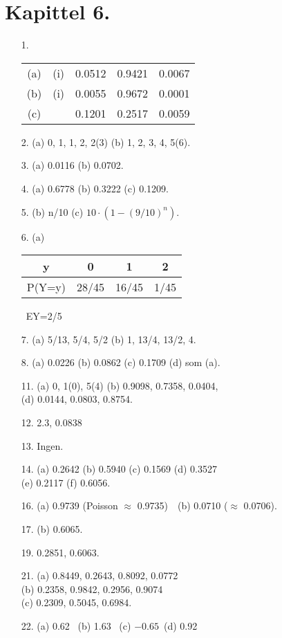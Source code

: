 \section*{Kapittel 6.}
\begin{itemize}         
\item[1.]   \begin{tabular}[t]{cclll}
              (a) & (i) & 0.0512 & 0.9421 & 0.0067\\
              (b) & (i) & 0.0055 & 0.9672 & 0.0001\\
              (c) &     & 0.1201 & 0.2517 & 0.0059
         \end{tabular}
\item[2.]  (a)  0, 1, 1, 2, 2(3)    (b)  1, 2, 3, 4, 5(6).
\item[3.]  (a)  0.0116    (b)  0.0702.
\item[4.]  (a)  0.6778    (b)  0.3222    (c)  0.1209.
\item[5.]  (b)  n/10     (c)  $10\cdot (1-(9/10)^n )$.
\item[6.]  (a)  \begin{tabular}{c|ccc}
            y &  0 & 1 & 2   \\ \hline
       P(Y=y) & 28/45 & 16/45 & 1/45                            
                \end{tabular} \  EY=2/5
\item[7.]  (a)  5/13, 5/4, 5/2    (b)  1, 13/4, 13/2, 4.
\item[8.]  (a)  0.0226   (b)  0.0862   (c)  0.1709   (d)  som (a).
\item[11.]  (a)  0, 1(0), 5(4)   (b)  0.9098, 0.7358, 0.0404,\\
              (d)  0.0144, 0.0803,  0.8754.
\item[12.] 2.3, 0.0838
\item[13.] Ingen.
\item[14.]  (a)  0.2642   (b)  0.5940   (c)  0.1569   (d)  0.3527\\
              (e)  0.2117   (f)  0.6056.
\item[16.] (a) 0.9739 (Poisson $\approx$ 0.9735)\ \ (b) 0.0710 ($\approx$ 0.0706).
\item[17.]  (b)  0.6065.
\item[19.] 0.2851, 0.6063.
\item[21.]  (a)  0.8449, 0.2643, 0.8092, 0.0772\\
              (b)  0.2358, 0.9842, 0.2956, 0.9074\\
              (c)  0.2309, 0.5045, 0.6984.
\item[22.]  (a)  0.62 \  (b)  1.63 \  (c)  $-0.65$\  (d)  0.92

\end{itemize}

